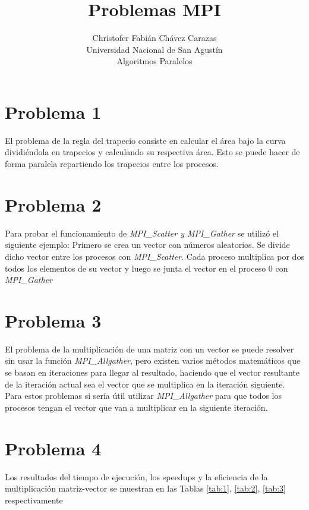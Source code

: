 \documentclass[a4paper,12pt]{article}
\begin{document}
\title{Problemas MPI}
\author{
Christofer Fabián Chávez Carazas \\
\small{Universidad Nacional de San Agustín} \\
\small{Algoritmos Paralelos}
}

\maketitle

\section{Problema 1}

El problema de la regla del trapecio consiste en calcular el área bajo la curva dividiéndola en trapecios y calculando
su respectiva área. Esto se puede hacer de forma paralela repartiendo los trapecios entre los procesos.

\section{Problema 2}

Para probar el funcionamiento de \textit{MPI\_Scatter y MPI\_Gather} se utilizó el siguiente ejemplo: Primero se crea
un vector con números aleatorios. Se divide dicho vector entre los procesos con \textit{MPI\_Scatter}. Cada
proceso multiplica por dos todos los elementos de su vector y luego se junta el vector en el proceso 0 con \textit{MPI\_Gather}

\section{Problema 3}

El problema de la multiplicación de una matriz con un vector se puede resolver sin usar la función \textit{MPI\_Allgather},
pero existen varios métodos matemáticos que se basan en iteraciones para llegar al resultado, haciendo que el vector resultante
de la iteración actual sea el vector que se multiplica en la iteración siguiente. Para estos problemas si sería útil
utilizar \textit{MPI\_Allgather} para que todos los procesos tengan el vector que van a multiplicar en la siguiente iteración.

\section{Problema 4}

Los resultados del tiempo de ejecución, los speedups y la eficiencia de la multiplicación matriz-vector se muestran
en las Tablas \ref{tab:1}, \ref{tab:2}, \ref{tab:3} respectivamente
\end{document}
